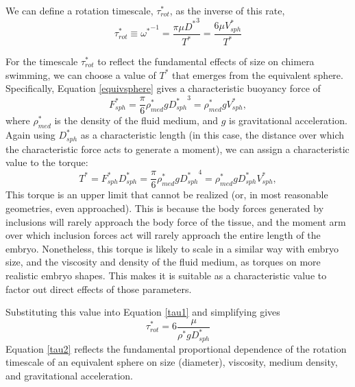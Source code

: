 \documentclass[10pt,a4paper]{article}
\begin{document}
We can define a rotation timescale, $\tau_{rot}^*$, as the inverse of this rate,
\begin{equation}\label{tau1}
	\tau_{rot}^* \equiv {\omega^*}^{-1} = \frac{\pi \mu {D^*}^3}{T^*} = \frac{6 \mu V_{sph}^*}{T^*}
\end{equation}

For the timescale $\tau_{rot}^*$ to reflect the fundamental effects of size on chimera swimming, we can choose a value of $T^*$ that emerges from the equivalent sphere.
Specifically, Equation \ref{equivsphere} gives a characteristic buoyancy force of
\begin{equation}\label{charF}
	F_{sph}^* = \frac{\pi}{6} \rho_{med}^* g {D_{sph}^*}^3 = \rho_{med}^* g V_{sph}^*,
\end{equation} 
where $\rho_{med}^*$ is the density of the fluid medium, and $g$ is gravitational acceleration.
Again using $D_{sph}^*$ as a characteristic length (in this case, the distance over which the characteristic force acts to generate a moment), we can assign a characteristic value to the torque:
\begin{equation}\label{charT}
	T^* = F_{sph}^* D_{sph}^* = \frac{\pi}{6} \rho_{med}^* g {D_{sph}^*}^4 = \rho_{med}^* g D_{sph}^* V_{sph}^*,
\end{equation} 
This torque is an upper limit that cannot be realized (or, in most reasonable geometries, even approached).
This is because the body forces generated by inclusions will rarely approach the body force of the tissue, and the moment arm over which inclusion forces act will rarely approach the entire length of the embryo. 
Nonetheless, this torque is likely to scale in a similar way with embryo size, and the viscosity and density of the fluid medium, as torques on more realistic embryo shapes. This makes it is suitable as a characteristic value to factor out direct effects of those parameters.

Substituting this value into Equation \ref{tau1} and simplifying gives
\begin{equation}\label{tau2}
	\tau_{rot}^* = 6 \frac{\mu}{\rho^* g D_{sph}^*}
\end{equation}
Equation \ref{tau2} reflects the fundamental proportional dependence of the rotation timescale of an equivalent sphere on size (diameter), viscosity, medium density, and gravitational acceleration.
\end{document}
